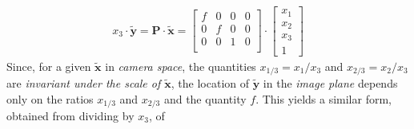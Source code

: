 \begin{equation*}
\begin{split}
x_3\cdot\mathbf{\tilde{y}}
=
\mathbf{P}\cdot\mathbf{\tilde{x}}
=
\begin{bmatrix}
f & 0 & 0 & 0\\
0 & f & 0 & 0\\
0 & 0 & 1 & 0\\
\end{bmatrix}\cdot\begin{bmatrix}x_1\\x_2\\x_3\\1\end{bmatrix}
\end{split}
\end{equation*}%
Since, for a given $\mathbf{\tilde{x}}$ in \textit{camera space}, the quantities 
$x_{1/3}=x_1/x_3$ and $x_{2/3}=x_2/x_3$ 
are \textit{invariant under the scale of $\mathbf{\tilde{x}}$}, 
the location of $\mathbf{\tilde{y}}$ in the \textit{image plane} depends only on the ratios $x_{1/3}$ and $x_{2/3}$ and the quantity $f$. This yields a similar form, obtained from dividing by $x_3$, of


